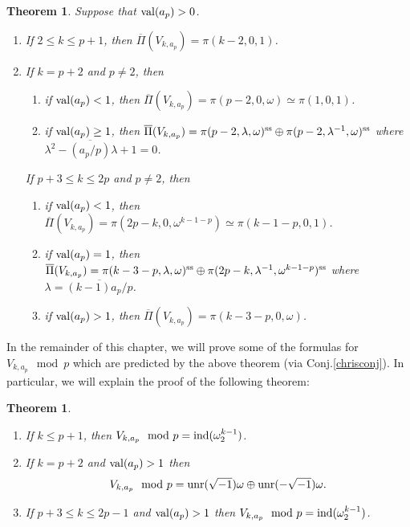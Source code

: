 \documentclass[11pt]{amsart}
\newtheorem{thm}[definit]{\bf{Theorem}}
\begin{document}
\begin{thm}\label{br1p4} 
Suppose that ${\rm val}(a_p)>0$.
\begin{enumerate} 
\item If $2 \leq k \leq p+1$, 
then $\overline{\Pi}(V_{k,a_p}) = \pi(k-2,0,1)$. 
\item If $k=p+2$ and $p \neq 2$, then  
\begin{enumerate} 
\item if ${\rm val}(a_p)<1$, then $\overline{\Pi}(V_{k,a_p}) = 
  \pi(p-2,0,\omega) \simeq \pi(1,0,1)$. 
\item if ${\rm val}(a_p) \geq 1$, then $\overline{\Pi}(V_{k,a_p}) = 
\pi(p-2,\lambda,\omega)^{\rm ss} \oplus 
\pi(p-2,\lambda^{-1},\omega)^{\rm ss}$ where 
$\lambda^2-\overline{(a_p/p)}\lambda+1=0$.  
\end{enumerate} 
If $p+3 \leq k \leq 2p$ and $p \neq 2$, then  
\begin{enumerate} 
\item if ${\rm val}(a_p)<1$, then $\overline{\Pi}(V_{k,a_p}) = 
  \pi(2p-k,0,\omega^{k-1-p}) \simeq \pi(k-1-p,0,1)$.  
\item  if ${\rm val}(a_p) = 1$, then $\overline{\Pi}(V_{k,a_p}) = 
\pi(k-3-p,\lambda,\omega)^{\rm ss} \oplus 
\pi(2p-k,\lambda^{-1},\omega^{k-1-p})^{\rm ss}$ where $\lambda = 
\overline{(k-1)a_p/p}$.  
\item if ${\rm val}(a_p) > 1$, then $\overline{\Pi}(V_{k,a_p}) = 
\pi(k-3-p,0,\omega)$. 
\end{enumerate} 
\end{enumerate} 
\end{thm} 
 
In the remainder of this chapter, we will prove some of the 
formulas for $V_{k,a_p} \mod{p}$ which are predicted by the above 
theorem (via Conj.\ref{chrisconj}). In particular, we will  
explain the proof of the following  
theorem: 
 
\begin{thm}\label{blz} 
\begin{enumerate} 
\item If $k \leq p+1$, then $V_{k,a_p} \mod{p} =  
{\rm ind} (\omega_2^{k-1})$.  
\item If $k=p+2$ and ${\rm val}(a_p) > 1$ then  
\[ V_{k,a_p} \mod{p} = {\rm unr}(\sqrt{-1}) \omega  
\oplus {\rm unr}(-\sqrt{-1}) \omega. \] 
\item If $p+3 \leq k \leq 2p-1$  
and ${\rm val}(a_p) > 1$ then 
$V_{k,a_p} \mod{p} =  
{\rm ind} (\omega_2^{k-1})$.  
\end{enumerate} 
\end{thm} 
 
\end{document}
